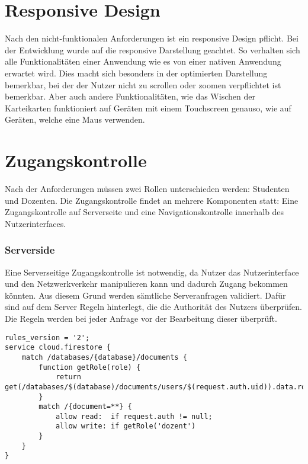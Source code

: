 \section{Responsive Design} %
Nach den nicht-funktionalen Anforderungen ist ein responsive Design pflicht.  
Bei der Entwicklung wurde auf die responsive Darstellung geachtet.
So verhalten sich alle Funktionalitäten einer Anwendung wie es von einer nativen Anwendung erwartet wird.
Dies macht sich besonders in der optimierten Darstellung bemerkbar, bei der der Nutzer nicht zu scrollen oder zoomen verpflichtet ist bemerkbar.
Aber auch andere Funktionalitäten, wie das Wischen der Karteikarten funktioniert auf Geräten mit einem Touchscreen genauso, wie auf Geräten, welche eine Maus verwenden.






\section{Zugangskontrolle}
Nach der Anforderungen müssen zwei Rollen unterschieden werden: Studenten und Dozenten.
Die Zugangskontrolle findet an mehrere Komponenten statt: Eine Zugangskontrolle auf Serverseite und eine Navigationskontrolle innerhalb des Nutzerinterfaces.


\subsubsection*{Serverside}
Eine Serverseitige Zugangskontrolle ist notwendig, da Nutzer das Nutzerinterface und den Netzwerkverkehr manipulieren kann und dadurch Zugang bekommen könnten.
Aus diesem Grund werden sämtliche Serveranfragen validiert.
Dafür sind auf dem Server Regeln hinterlegt, die die Authorität des Nutzers überprüfen.
Die Regeln werden bei jeder Anfrage vor der Bearbeitung dieser überprüft.

\begin{lstlisting}[caption={Einfaches Beispiel der Serverside Regeln}, label=lst:firestoreRules]
rules_version = '2';
service cloud.firestore {
    match /databases/{database}/documents {
        function getRole(role) {
            return get(/databases/$(database)/documents/users/$(request.auth.uid)).data.roles[role]
        }
        match /{document=**} {
            allow read:  if request.auth != null;
            allow write: if getRole('dozent')
        }
    }
}\end{lstlisting}


